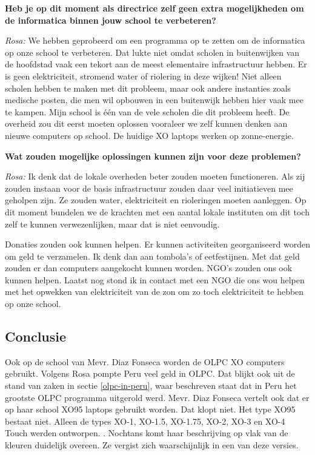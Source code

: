 \textbf{Heb je op dit moment als directrice zelf geen extra mogelijkheden om de informatica binnen jouw school te verbeteren?}

\textit{Rosa:} We hebben geprobeerd om een programma op te zetten om de informatica op onze school te verbeteren. Dat lukte niet omdat scholen in buitenwijken van de hoofdstad vaak een tekort aan de meest elementaire infrastructuur hebben. Er is geen elektriciteit, stromend water of riolering in deze wijken! Niet alleen scholen hebben te maken met dit probleem, maar ook andere instanties zoals medische posten, die men wil opbouwen in een buitenwijk hebben hier vaak mee te kampen. Mijn school is één van de vele scholen die dit probleem heeft. De overheid zou dit eerst moeten oplossen vooraleer we zelf kunnen denken aan nieuwe computers op school. De huidige XO laptops werken op zonne-energie. 

\textbf{Wat zouden mogelijke oplossingen kunnen zijn voor deze problemen?}

\textit{Rosa:} Ik denk dat de lokale overheden beter zouden moeten functioneren. Als zij zouden instaan voor de basis infrastructuur zouden daar veel initiatieven mee geholpen zijn. Ze zouden water, elektriciteit en rioleringen moeten aanleggen. Op dit moment bundelen we de krachten met een aantal lokale instituten om dit toch zelf te kunnen verwezenlijken, maar dat is niet eenvoudig. 

Donaties zouden ook kunnen helpen. Er kunnen activiteiten georganiseerd worden om geld te verzamelen. Ik denk dan aan tombola's of eetfestijnen. Met dat geld zouden er dan computers aangekocht kunnen worden. NGO's zouden ons ook kunnen helpen. Laatst nog stond ik in contact met een NGO die ons wou helpen met het opwekken van elektriciteit van de zon om zo toch elektriciteit te hebben op onze school.

\subsection{Conclusie}
Ook op de school van Mevr. Diaz Fonseca worden de OLPC XO computers gebruikt. Volgens Rosa pompte Peru veel geld in OLPC. Dat blijkt ook uit de stand van zaken in sectie \ref{olpc-in-peru}, waar beschreven staat dat in Peru het grootste OLPC programma uitgerold werd. Mevr. Diaz Fonseca vertelt ook dat er op haar school XO95 laptops gebruikt worden. Dat klopt niet. Het type XO95 bestaat niet. Alleen de types XO-1, XO-1.5, XO-1.75, XO-2, XO-3 en XO-4 Touch werden ontworpen. \autocite{OLPC2016}. Nochtans komt haar beschrijving op vlak van de kleuren duidelijk overeen. Ze vergist zich waarschijnlijk in een van deze versies.

